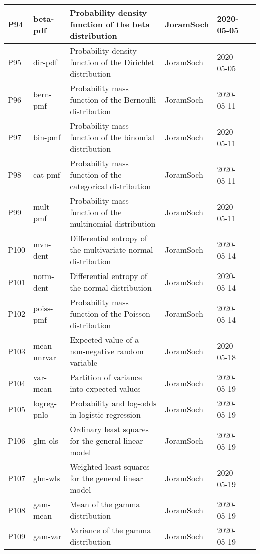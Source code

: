 \documentclass[a4paper,12pt,twoside]{book}
\begin{document}
\begin{longtable}{|p{1cm}|p{2cm}|p{6.5cm}|p{3cm}|p{2cm}|c|}
P94 & beta-pdf & Probability density function of the beta distribution & JoramSoch & 2020-05-05 & \pageref{sec:beta-pdf} \\ \hline
P95 & dir-pdf & Probability density function of the Dirichlet distribution & JoramSoch & 2020-05-05 & \pageref{sec:dir-pdf} \\ \hline
P96 & bern-pmf & Probability mass function of the Bernoulli distribution & JoramSoch & 2020-05-11 & \pageref{sec:bern-pmf} \\ \hline
P97 & bin-pmf & Probability mass function of the binomial distribution & JoramSoch & 2020-05-11 & \pageref{sec:bin-pmf} \\ \hline
P98 & cat-pmf & Probability mass function of the categorical distribution & JoramSoch & 2020-05-11 & \pageref{sec:cat-pmf} \\ \hline
P99 & mult-pmf & Probability mass function of the multinomial distribution & JoramSoch & 2020-05-11 & \pageref{sec:mult-pmf} \\ \hline
P100 & mvn-dent & Differential entropy of the multivariate normal distribution & JoramSoch & 2020-05-14 & \pageref{sec:mvn-dent} \\ \hline
P101 & norm-dent & Differential entropy of the normal distribution & JoramSoch & 2020-05-14 & \pageref{sec:norm-dent} \\ \hline
P102 & poiss-pmf & Probability mass function of the Poisson distribution & JoramSoch & 2020-05-14 & \pageref{sec:poiss-pmf} \\ \hline
P103 & mean-nnrvar & Expected value of a non-negative random variable & JoramSoch & 2020-05-18 & \pageref{sec:mean-nnrvar} \\ \hline
P104 & var-mean & Partition of variance into expected values & JoramSoch & 2020-05-19 & \pageref{sec:var-mean} \\ \hline
P105 & logreg-pnlo & Probability and log-odds in logistic regression & JoramSoch & 2020-05-19 & \pageref{sec:logreg-pnlo} \\ \hline
P106 & glm-ols & Ordinary least squares for the general linear model & JoramSoch & 2020-05-19 & \pageref{sec:glm-ols} \\ \hline
P107 & glm-wls & Weighted least squares for the general linear model & JoramSoch & 2020-05-19 & \pageref{sec:glm-wls} \\ \hline
P108 & gam-mean & Mean of the gamma distribution & JoramSoch & 2020-05-19 & \pageref{sec:gam-mean} \\ \hline
P109 & gam-var & Variance of the gamma distribution & JoramSoch & 2020-05-19 & \pageref{sec:gam-var} \\ \hline

\end{longtable}
\end{document}
